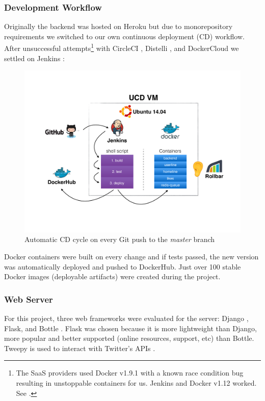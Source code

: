 \documentclass{article}
\begin{document}
\subsubsection*{Development Workflow} %
Originally the backend was hosted on Heroku \cite{heroku} but due to monorepository requirements \cite{ll-blog-week9} we switched to our own continuous deployment (CD) workflow. After unsuccessful attempts\footnote{The SaaS providers used Docker v1.9.1 with a known race condition bug resulting in unstoppable containers for us. Jenkins and Docker v1.12 worked. See \cite{ll-blog-week9}\cite{ll-blog-week10}\cite{ll-blog-week11}.} with CircleCI \cite{circleci}, Distelli \cite{distelli}, and DockerCloud \cite{dockercloud} we settled on Jenkins \cite{jenkins}:

\begin{figure}[H]
    \centering
    \includegraphics[width=\textwidth,trim={0 4cm 0 3.5cm},clip]{development_workflow}
    \caption{Automatic CD cycle on every Git push to the \textit{master} branch}
\end{figure}

\noindent Docker containers were built on every change and if tests passed, the new version was automatically deployed and pushed to DockerHub. Just over 100 stable Docker images (deployable artifacts) were created during the project.

\subsubsection*{Web Server} %
For this project, three web frameworks were evaluated for the server: Django \cite{django}, Flask, and Bottle \cite{bottle}. Flask was chosen because it is more lightweight than Django, more popular and better supported (online resources, support, etc) than Bottle. Tweepy is used to interact with Twitter's APIs \cite{tweepy}.
\end{document}
